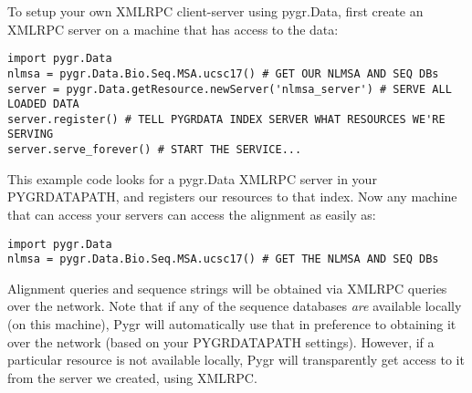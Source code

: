 \documentclass{howto}
\begin{document}
To setup your own XMLRPC client-server using pygr.Data,
first create an XMLRPC server on a machine that
has access to the data:

\begin{verbatim}
import pygr.Data
nlmsa = pygr.Data.Bio.Seq.MSA.ucsc17() # GET OUR NLMSA AND SEQ DBs
server = pygr.Data.getResource.newServer('nlmsa_server') # SERVE ALL LOADED DATA
server.register() # TELL PYGRDATA INDEX SERVER WHAT RESOURCES WE'RE SERVING
server.serve_forever() # START THE SERVICE...
\end{verbatim}

This example code looks for a pygr.Data XMLRPC server in your PYGRDATAPATH,
and registers our resources to that index.  Now any machine that can access
your servers can access the alignment as easily as:
\begin{verbatim}
import pygr.Data
nlmsa = pygr.Data.Bio.Seq.MSA.ucsc17() # GET THE NLMSA AND SEQ DBs
\end{verbatim}
Alignment queries and sequence strings will be obtained via XMLRPC 
queries over the network.  Note that if any of the sequence databases
{\em are} available locally (on this machine), Pygr will automatically use that 
in preference to obtaining it over the network (based on your PYGRDATAPATH
settings).  However, if a particular resource is not available locally,
Pygr will transparently get access to it from the server we created,
using XMLRPC.
\end{document}
